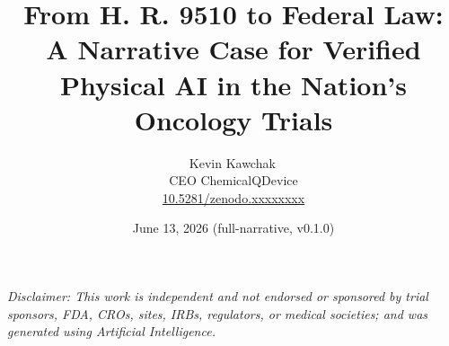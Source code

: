 \documentclass[11pt]{article}
\title{From H. R. 9510 to Federal Law:\\ A Narrative Case for Verified Physical AI in the Nation's Oncology Trials}
\author{Kevin Kawchak\,\orcidicon{0009-0007-5457-8667}\\ CEO ChemicalQDevice\\ \href{https://doi.org/10.5281/zenodo.xxxxxxxx}{10.5281/zenodo.xxxxxxxx}}
\date{June 13, 2026 \quad (full-narrative, v0.1.0)}
\begin{document}
\maketitle
\thispagestyle{empty}

\begin{abstract}

\end{abstract}

\vspace{0.2em}\noindent\footnotesize\textit{Disclaimer: This work is independent
and not endorsed or sponsored by trial sponsors, FDA, CROs, sites, IRBs,
regulators, or medical societies; and was generated using Artificial
Intelligence.}\normalsize\par




\tableofcontents
\vspace{0.3cm}










\clearpage


\clearpage
{}
\begingroup\raggedright\nocite{*}\endgroup


\end{document}
